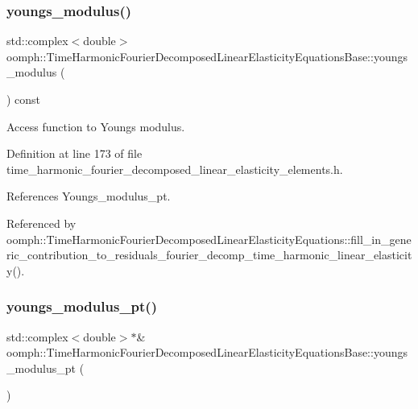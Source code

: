 \subsubsection{\texorpdfstring{youngs\+\_\+modulus()}{youngs\_modulus()}}
{\footnotesize\ttfamily std\+::complex$<$double$>$ oomph\+::\+Time\+Harmonic\+Fourier\+Decomposed\+Linear\+Elasticity\+Equations\+Base\+::youngs\+\_\+modulus (\begin{DoxyParamCaption}{ }\end{DoxyParamCaption}) const\hspace{0.3cm}{\ttfamily [inline]}}



Access function to Young\textquotesingle{}s modulus. 



Definition at line 173 of file time\+\_\+harmonic\+\_\+fourier\+\_\+decomposed\+\_\+linear\+\_\+elasticity\+\_\+elements.\+h.



References Youngs\+\_\+modulus\+\_\+pt.



Referenced by oomph\+::\+Time\+Harmonic\+Fourier\+Decomposed\+Linear\+Elasticity\+Equations\+::fill\+\_\+in\+\_\+generic\+\_\+contribution\+\_\+to\+\_\+residuals\+\_\+fourier\+\_\+decomp\+\_\+time\+\_\+harmonic\+\_\+linear\+\_\+elasticity().

\mbox{\label{classoomph_1_1TimeHarmonicFourierDecomposedLinearElasticityEquationsBase_a36aad144d015678c13d506497a6bb3a2}} 
\subsubsection{\texorpdfstring{youngs\+\_\+modulus\+\_\+pt()}{youngs\_modulus\_pt()}}
{\footnotesize\ttfamily std\+::complex$<$double$>$$\ast$\& oomph\+::\+Time\+Harmonic\+Fourier\+Decomposed\+Linear\+Elasticity\+Equations\+Base\+::youngs\+\_\+modulus\+\_\+pt (\begin{DoxyParamCaption}{ }\end{DoxyParamCaption})\hspace{0.3cm}{\ttfamily [inline]}}



